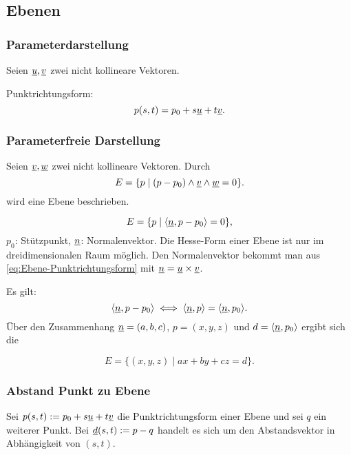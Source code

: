 \subsection{Ebenen}
\subsubsection{Parameterdarstellung}
Seien $\underline{u}, \underline{v}$ zwei nicht kollineare Vektoren.

Punktrichtungsform:
\begin{equation}\label{eq:Ebene-Punktrichtungsform}
p(s,t) = p_0+s\underline{u}+t\underline{v}.
\end{equation}

\subsubsection{Parameterfreie Darstellung}
Seien $\underline{v}, \underline{w}$ zwei nicht kollineare Vektoren.
Durch
\begin{equation}
E = \{p\mid (p-p_0)\wedge\underline{v}\wedge\underline{w}=0\}.
\end{equation}
wird eine Ebene beschrieben.

\begin{equation}
E = \{p\mid \langle\underline{n},p-p_0\rangle=0\},
\end{equation}
$p_0$: Stützpunkt, $\underline{n}$: Normalenvektor. Die Hesse-Form einer
Ebene ist nur im dreidimensionalen Raum möglich.
Den Normalenvektor bekommt man aus \eqref{eq:Ebene-Punktrichtungsform}
mit $\underline{n} = \underline{u}\times\underline{v}$.

Es gilt:
\begin{equation}
\langle\underline{n},p-p_0\rangle\iff \langle\underline{n},p\rangle = \langle\underline{n},p_0\rangle.
\end{equation}
Über den Zusammenhang $\underline{n}=(a,b,c)$, $p=(x,y,z)$ und $d=\langle\underline{n},p_0\rangle$
ergibt sich die

\begin{equation}
E = \{(x,y,z)\mid ax+by+cz = d\}.
\end{equation}

\subsubsection{Abstand Punkt zu Ebene}
Sei $p(s,t):=p_0+s\underline{u}+t\underline{v}$ die Punktrichtungsform einer Ebene
und sei $q$ ein weiterer Punkt. Bei $\underline{d}(s,t):=p-q$ handelt es sich um
den Abstandsvektor in Abhängigkeit von $(s,t)$.

